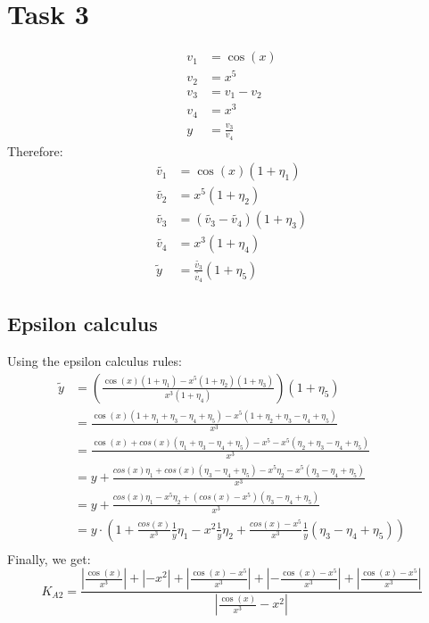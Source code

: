\section{Task 3}
\begin{align*}
    v_1 &= \cos(x) \\ 
    v_2 &= x^5 \\ 
    v_3 &= v_1-v_2 \\ 
    v_4 &= x^3 \\ 
    y &= \frac{v_3}{v_4}
\end{align*}
Therefore:
\begin{align*}
    \tilde{v_1} &= \cos(x) (1+\eta_1)\\ 
    \tilde{v_2} &= x^5(1+\eta_2)\\ 
    \tilde{v_3} &= (\tilde{v_3} - \tilde{v_4})(1+\eta_3) \\ 
    \tilde{v_4} &= x^3 (1+\eta_4) \\
    \tilde{y} &= \frac{\tilde{v_3}}{\tilde{v_4}}(1+\eta_5)
\end{align*}
\subsection{Epsilon calculus}
Using the epsilon calculus rules:
\begin{align*}
    \tilde{y} &= \left(
    \displaystyle\frac{\cos(x)(1+\eta_1) - x^5(1+\eta_2)(1+\eta_3)}
    {x^3(1+\eta_4)}
    \right) (1+\eta_5) \\
    &=\displaystyle\frac{\cos(x)(1+\eta_1+\eta_3-\eta_4+\eta_5)-
    x^5(1+\eta_2+\eta_3-\eta_4+\eta_5)}{x^3}\\
    &=\displaystyle\frac{\cos(x)+cos(x)(\eta_1+\eta_3-\eta_4+\eta_5)-
    x^5-x^5(\eta_2+\eta_3-\eta_4+\eta_5)}{x^3}\\
    &=y+\displaystyle\frac{cos(x)\eta_1+cos(x)(\eta_3-\eta_4+\eta_5)-
    x^5\eta_2-x^5(\eta_3-\eta_4+\eta_5)}{x^3}\\
    &=y+\displaystyle\frac{cos(x)\eta_1-x^5\eta_2+
    (cos(x)-x^5)(\eta_3-\eta_4+\eta_5)}{x^3}\\
    &=y\cdot\left(1+\frac{cos(x)}{x^3}\frac1y\eta_1-x^2\frac1y\eta_2+
    \frac{cos(x)-x^5}{x^3}\frac1y(\eta_3-\eta_4+\eta_5)\right)\\
\end{align*}
Finally, we get:
$$ K_{A2} = \displaystyle\frac{
    \left|\frac{\cos(x)}{x^3}\right| + \left|-x^2\right|
+ \left| \frac{\cos(x)-x^5}{x^3} \right|
+ \left|-\frac{\cos(x)-x^5}{x^3} \right|
+ \left| \frac{\cos(x)-x^5}{x^3} \right|
} {\left|\frac{\cos(x)}{x^3} - x^2\right|}
$$

